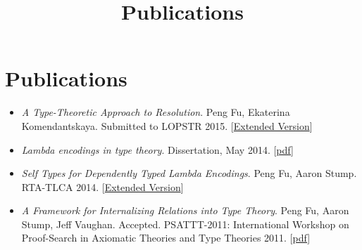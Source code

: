 \documentclass[10pt]{article}
\title{\bfseries\Large Publications}
\date{}
\begin{document}
\maketitle
\vspace{-4em}

\vspace{20pt}





\section*{Publications}

\begin{itemize}
\item \textit{A Type-Theoretic Approach to Resolution}. Peng Fu, Ekaterina Komendantskaya. Submitted to LOPSTR 2015. [\href{../../document/papers/tm-lp.pdf}{Extended Version}]

\item \textit{Lambda encodings in type theory}. Dissertation, May 2014. [\href{../../document/papers/dissertation.pdf}{pdf}]

\item \textit{Self Types for Dependently Typed Lambda Encodings}. Peng Fu, Aaron Stump. RTA-TLCA 2014. [\href{../../document/papers/rta-tlca.pdf}{Extended Version}]

\item \textit{A Framework for Internalizing Relations into Type Theory}. Peng Fu, Aaron Stump, Jeff Vaughan. Accepted. PSATTT-2011: International Workshop on Proof-Search in Axiomatic Theories and Type Theories 2011. [\href{../../document/papers/psattt-paper.pdf}{pdf}]
  
\end{itemize}
\end{document}
